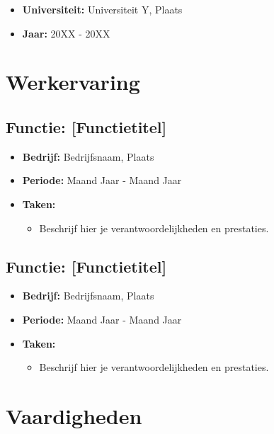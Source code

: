 \documentclass[
]{article}
\providecommand{\tightlist}{%
  \setlength{\itemsep}{0pt}\setlength{\parskip}{0pt}}
\begin{document}
\begin{itemize}
\tightlist
\item
  \textbf{Universiteit:} Universiteit Y, Plaats
\item
  \textbf{Jaar:} 20XX - 20XX
\end{itemize}

\hypertarget{werkervaring}{%
\section{Werkervaring}\label{werkervaring}}

\hypertarget{functie-functietitel}{%
\subsection{Functie: {[}Functietitel{]}}\label{functie-functietitel}}

\begin{itemize}
\tightlist
\item
  \textbf{Bedrijf:} Bedrijfsnaam, Plaats
\item
  \textbf{Periode:} Maand Jaar - Maand Jaar
\item
  \textbf{Taken:}

  \begin{itemize}
  \tightlist
  \item
    Beschrijf hier je verantwoordelijkheden en prestaties.
  \end{itemize}
\end{itemize}

\hypertarget{functie-functietitel-1}{%
\subsection{Functie: {[}Functietitel{]}}\label{functie-functietitel-1}}

\begin{itemize}
\tightlist
\item
  \textbf{Bedrijf:} Bedrijfsnaam, Plaats
\item
  \textbf{Periode:} Maand Jaar - Maand Jaar
\item
  \textbf{Taken:}

  \begin{itemize}
  \tightlist
  \item
    Beschrijf hier je verantwoordelijkheden en prestaties.
  \end{itemize}
\end{itemize}

\hypertarget{vaardigheden}{%
\section{Vaardigheden}\label{vaardigheden}}
\end{document}
